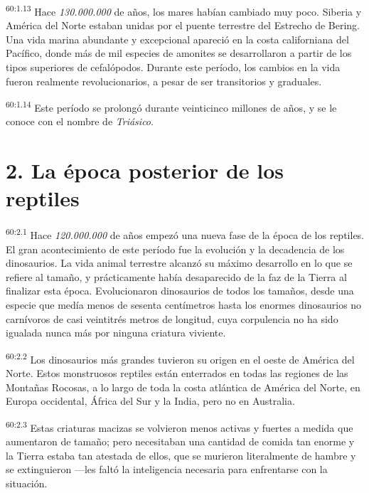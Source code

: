 \par
\textsuperscript{60:1.13} Hace \textit{130.000.000} de años, los mares habían cambiado muy poco. Siberia y América del Norte estaban unidas por el puente terrestre del Estrecho de Bering. Una vida marina abundante y excepcional apareció en la costa californiana del Pacífico, donde más de mil especies de amonites se desarrollaron a partir de los tipos superiores de cefalópodos. Durante este período, los cambios en la vida fueron realmente revolucionarios, a pesar de ser transitorios y graduales.

\par
\textsuperscript{60:1.14} Este período se prolongó durante veinticinco millones de años, y se le conoce con el nombre de \textit{Triásico}.

\section*{2. La época posterior de los reptiles}
\par
\textsuperscript{60:2.1} Hace \textit{120.000.000} de años empezó una nueva fase de la época de los reptiles. El gran acontecimiento de este período fue la evolución y la decadencia de los dinosaurios. La vida animal terrestre alcanzó su máximo desarrollo en lo que se refiere al tamaño, y prácticamente había desaparecido de la faz de la Tierra al finalizar esta época. Evolucionaron dinosaurios de todos los tamaños, desde una especie que medía menos de sesenta centímetros hasta los enormes dinosaurios no carnívoros de casi veintitrés metros de longitud, cuya corpulencia no ha sido igualada nunca más por ninguna criatura viviente.

\par
\textsuperscript{60:2.2} Los dinosaurios más grandes tuvieron su origen en el oeste de América del Norte. Estos monstruosos reptiles están enterrados en todas las regiones de las Montañas Rocosas, a lo largo de toda la costa atlántica de América del Norte, en Europa occidental, África del Sur y la India, pero no en Australia.

\par
\textsuperscript{60:2.3} Estas criaturas macizas se volvieron menos activas y fuertes a medida que aumentaron de tamaño; pero necesitaban una cantidad de comida tan enorme y la Tierra estaba tan atestada de ellos, que se murieron literalmente de hambre y se extinguieron ---les faltó la inteligencia necesaria para enfrentarse con la situación.


